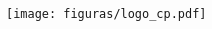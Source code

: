 
\newcommand{\titulo}[1]{\def\eltitulo{#1}}
\newcommand{\tituloen}[1]{\def\eltituloen{#1}}
\newcommand{\autor}[1]{\def\elautor{#1}}

\titulo{Título}
\tituloen{Title}
\autor{Autor}

\thispagestyle{empty}

\hskip-1.5cm
\begin{minipage}[c][1\totalheight][s]{3cm}
  \begin{center}
    \texttt{[image: figuras/logo\_cp.pdf]}\\[10pt]
    \hskip2pt\vrule width2pt height19.5cm\hskip1mm
    \vrule width1pt height19.5cm\\[10pt]
  \end{center}
\end{minipage}\quad
